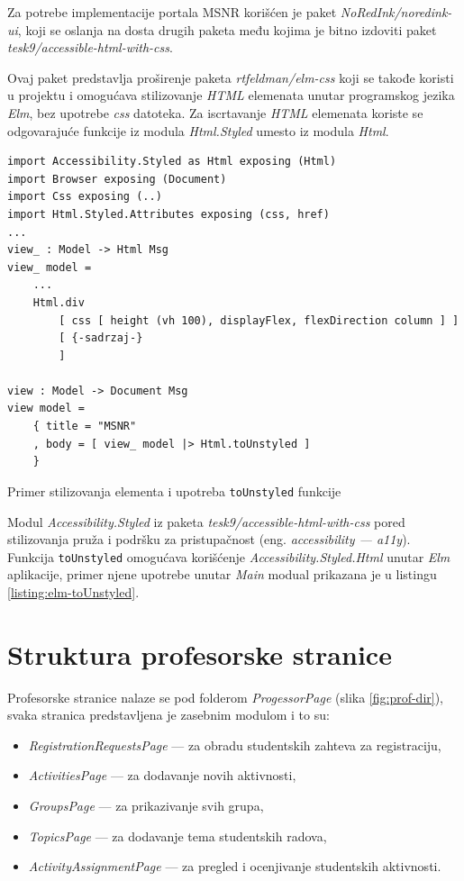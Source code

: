 \documentclass[12pt,oneside]{memoir}
\begin{document}
Za potrebe implementacije portala MSNR korišćen je paket \emph{NoRedInk/noredink-ui},
koji se oslanja na dosta drugih paketa među kojima je bitno izdoviti paket 
\emph{tesk9/accessible-html-with-css}.

Ovaj paket predstavlja proširenje paketa \emph{rtfeldman/elm-css} koji se takođe koristi u projektu
i omogućava stilizovanje \emph{HTML} elemenata unutar programskog jezika \emph{Elm}, bez upotrebe
\emph{css} datoteka. Za iscrtavanje \emph{HTML} elemenata koriste se odgovarajuće funkcije iz
modula \emph{Html.Styled} umesto iz modula \emph{Html}.

\begin{listing}[h]
\begin{verbatim}
import Accessibility.Styled as Html exposing (Html)
import Browser exposing (Document)
import Css exposing (..)
import Html.Styled.Attributes exposing (css, href)
...
view_ : Model -> Html Msg
view_ model =
    ... 
    Html.div
        [ css [ height (vh 100), displayFlex, flexDirection column ] ]
        [ {-sadrzaj-}
        ]

view : Model -> Document Msg
view model =
    { title = "MSNR"
    , body = [ view_ model |> Html.toUnstyled ]
    }
\end{verbatim}
\caption{Primer stilizovanja elementa i upotreba \texttt{toUnstyled} funkcije}
\label{listing:elm-toUnstyled}
\end{listing}

Modul \emph{Accessibility.Styled} iz paketa \emph{tesk9/accessible-html-with-css} pored stilizovanja pruža i podršku za pristupačnost
(eng. \emph{accessibility --- a11y}). Funkcija \texttt{toUnstyled} omogućava korišćenje \emph{Accessibility.Styled.Html} unutar \emph{Elm} aplikacije,
primer njene upotrebe unutar \emph{Main} modual prikazana je u listingu \ref{listing:elm-toUnstyled}.

\section{Struktura profesorske stranice}
Profesorske stranice nalaze se pod folderom \emph{ProgessorPage} (slika \ref{fig:prof-dir}),
svaka stranica predstavljena je zasebnim modulom i to su:
\begin{itemize}
  \item \emph{RegistrationRequestsPage} --- za obradu studentskih zahteva za registraciju,
  \item \emph{ActivitiesPage} --- za dodavanje novih aktivnosti,
  \item \emph{GroupsPage} --- za prikazivanje svih grupa,
  \item \emph{TopicsPage} --- za dodavanje tema studentskih radova,
  \item \emph{ActivityAssignmentPage} --- za pregled i ocenjivanje studentskih aktivnosti.
\end{itemize}
\end{document}
